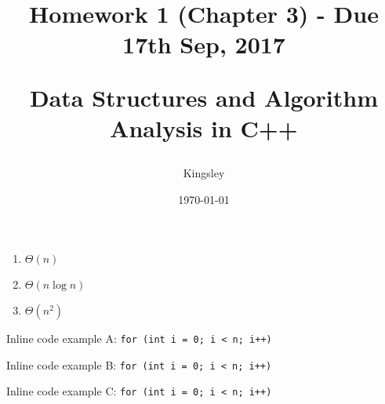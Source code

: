 \documentclass[titlepage]{article}
\title{
Homework 1 (Chapter 3) - Due 17th Sep, 2017\\
\begin{large}
Data Structures and Algorithm Analysis in C++
\end{large}
}
\author{Kingsley}
\date{\today}
\begin{document}
\maketitle

\begin{enumerate}[label=(\alph*)]
\item $\Theta(n)$
\item $\Theta(n\log n)$
\item $\Theta(n^2)$
\end{enumerate}

Inline code example A: \lstinline{for (int i = 0; i < n; i++)}

Inline code example B: \lstinline{for (int i = 0; i < n; i++)}

Inline code example C: \texttt{for (int i = 0; i < n; i++)}\\
\end{document}
